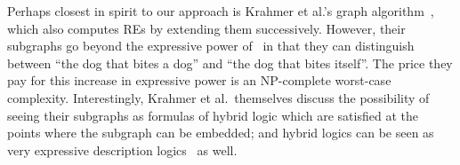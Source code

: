 Perhaps closest in spirit to our approach is Krahmer et al.'s graph
algorithm~, which also computes REs by
extending them successively.  However, their subgraphs go beyond the
expressive power of \alc\ in that they can distinguish between ``the
dog that bites a dog'' and ``the dog that bites itself''.  The price
they pay for this increase in expressive power is an NP-complete
worst-case complexity.  Interestingly, Krahmer et al.\ themselves
discuss the possibility of seeing their subgraphs as formulas of
hybrid logic which are satisfied at the points where the subgraph can
be embedded; and hybrid logics can be seen as very expressive
description logics~\cite{arec:hybr05b} as well.











